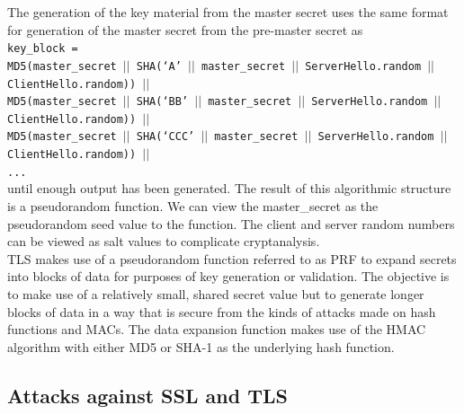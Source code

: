 \documentclass[12pt]{article}
\begin{document}
 The generation of the key material from the master secret uses the same format for generation of the master secret from the pre-master secret as\\
 \texttt{key\_block =\\ 
 	MD5(master\_secret $||$ SHA(‘A’ $||$ master\_secret $||$ ServerHello.random $||$ ClientHello.random)) $||$ \\
 	MD5(master\_secret $||$ SHA(‘BB’ $||$ master\_secret $||$ ServerHello.random $||$ ClientHello.random)) $||$\\
 	MD5(master\_secret $||$ SHA(‘CCC’ $||$ master\_secret $||$ ServerHello.random $||$ ClientHello.random)) $||$\\
 	...}\\
 until enough output has been generated. The result of this algorithmic structure is a pseudorandom function. We can view the master\_secret as the pseudorandom seed value to the function. The client and server random numbers can be viewed as salt values to complicate cryptanalysis.\\
 TLS makes use of a pseudorandom function referred to as PRF to expand secrets into blocks of data for purposes of key generation or validation. The objective is to make use of a relatively small, shared secret value but to generate longer blocks of data in a way that is secure from the kinds of attacks made on hash functions and MACs. The data expansion function makes use of the HMAC algorithm with either MD5 or SHA-1 as the underlying hash function.
 
 \subsection{Attacks against SSL and TLS}
\end{document}

